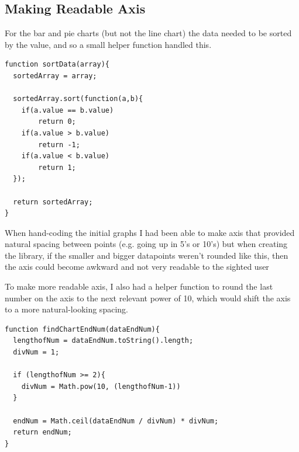 \documentclass[ %
                    author={Aleena Baig},
                supervisor={Dr Simon Lock},
                    degree={BSc},
                     title={On Making Web Accessible Graphs},
                  subtitle={},
                      year={2019} ]{dissertation}
\begin{document}

\subsection{Making Readable Axis}

For the bar and pie charts (but not the line chart) the data needed to be sorted by the value, and so a small helper function handled this.

\begin{lstlisting}
function sortData(array){
  sortedArray = array;

  sortedArray.sort(function(a,b){
    if(a.value == b.value)
        return 0;
    if(a.value > b.value)
        return -1;
    if(a.value < b.value)
        return 1;
  });

  return sortedArray;
}
\end{lstlisting}

When hand-coding the initial graphs I had been able to make axis that provided natural spacing between points (e.g. going up in 5's or 10's) but when creating the library, if the smaller and bigger datapoints weren't rounded like this, then the axis could become awkward and not very readable to the sighted user

To make more readable axis, I also had a helper function to round the last number on the axis to the next relevant power of 10, which would shift the axis to a more natural-looking spacing.

\begin{lstlisting}
function findChartEndNum(dataEndNum){
  lengthofNum = dataEndNum.toString().length;
  divNum = 1;

  if (lengthofNum >= 2){
    divNum = Math.pow(10, (lengthofNum-1))
  }

  endNum = Math.ceil(dataEndNum / divNum) * divNum;
  return endNum;
}
\end{lstlisting}
\end{document}
